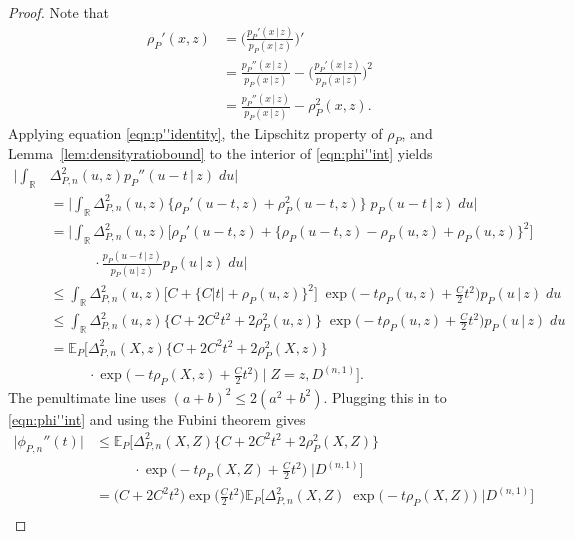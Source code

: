 \documentclass[aos]{imsart}
\newcommand{\R}{\mathbb{R}}
\newcommand{\E}{\mathbb{E}}
\newcommand{\given}{\,|\,}
\begin{document}
\begin{proof}
		Note that 
		\begin{align}
			\rho_{P}'(x,z) &=  \bigg(\frac{p_P'(x\given  z)}{p_P(x\given  z)}\bigg)' \nonumber\\
			&= \frac{p_P''(x\given  z)}{p_P(x\given  z)} - \bigg(\frac{p_P'(x\given  z)}{p_P(x\given  z)}\bigg)^2 \nonumber\\
			&= \frac{p_P''(x\given  z)}{p_P(x\given  z)} - \rho^2_{P}(x, z). \label{eqn:p''identity}
		\end{align} 
		Applying equation \eqref{eqn:p''identity}, the Lipschitz property of $\rho_P$, and Lemma~\ref{lem:densityratiobound} to the interior of \eqref{eqn:phi''int} yields \begin{align*}
			\bigg| \int_\R &\Delta_{P,n}^2 (u,z) p_P''(u-t\given  z) \; du  \bigg| \\
			&= \bigg| \int_\R \Delta_{P,n}^2 (u,z) \big\{\rho_{P}'(u-t, z) + \rho_{P}^2(u-t, z)\big\} \;p_P(u-t\given  z)  \; du \bigg|\\
			&= \bigg| \int_\R \Delta_{P,n}^2 (u,z) \big[\rho_{P}'(u-t, z) + \{\rho_{P}(u-t, z) - \rho_{P}(u, z) + \rho_{P}(u, z)\}^2\big] \\
            &\phantom{=\bigg| \int_\R} \cdot \frac{p_P(u-t\given  z)}{p_P(u\given  z)}p_P(u\given  z)  \; du \bigg| \\
			&\leq \int_\R \Delta_{P,n}^2 (u,z) \big[C + \{C|t| + \rho_{P}(u, z)\}^2\big] \;\exp\bigg(-t\rho_P(u,z)+\frac{C}{2}t^2\bigg)p_P(u\given  z)  \; du\\
			&\leq \int_\R \Delta_{P,n}^2 (u,z) \big\{C + 2C^2t^2 + 2\rho^2_{P}(u, z)\big\} \;\exp\bigg(-t\rho_P(u,z)+\frac{C}{2}t^2\bigg)p_P(u\given  z)  \; du\\
			&= \E_P \Bigg[ \Delta_{P,n}^2 (X,z) \big\{C + 2C^2t^2 + 2\rho^2_{P}(X, z)\big\} \\
            & \phantom{=\E_P \Bigg[} \cdot \exp\bigg(-t\rho_P(X,z)+\frac{C}{2}t^2\bigg) \; \Bigg|\; Z=z, D^{(n,1)}\Bigg].
		\end{align*}
		The penultimate line uses $(a+b)^2\leq 2(a^2+b^2)$. Plugging this in to \eqref{eqn:phi''int} and using the Fubini theorem gives
		\begin{align}
			\big| \phi_{P,n}''(t) \big| &\leq \E_P \Bigg[ \Delta_{P,n}^2 (X,Z) \big\{C + 2C^2t^2 + 2\rho^2_{P}(X, Z)\big\} \\ & \phantom{= \E_P \Bigg[}\cdot\exp\bigg(-t\rho_P(X,Z)+\frac{C}{2}t^2\bigg) \; \Bigg| D^{(n,1)}\Bigg] \nonumber\\
			&= \big(C + 2C^2t^2\big)\exp\bigg(\frac{C}{2}t^2\bigg) \E_P \Big[ \Delta_{P,n}^2 (X,Z) \;\exp\big(-t\rho_P(X,Z)\big) \; \Big| D^{(n,1)}\Big] \nonumber\\

\end{align}
\end{proof}
\end{document}
